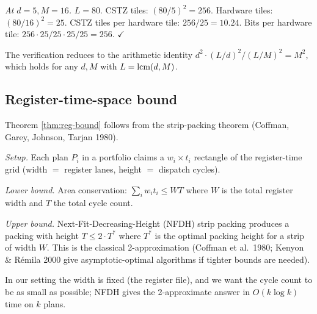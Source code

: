 \emph{At $d = 5, M = 16$.} $L = 80$. CSTZ tiles:
$(80/5)^2 = 256$. Hardware tiles: $(80/16)^2 = 25$.
CSTZ tiles per hardware tile: $256/25 = 10.24$.
Bits per hardware tile: $256 \cdot 25 / 25 \cdot 25
/ 25 = 256$. $\checkmark$

The verification reduces to the arithmetic
identity $d^2 \cdot (L/d)^2 / (L/M)^2 = M^2$,
which holds for any $d, M$ with $L = \operatorname{lcm}(d, M)$.

\subsection{Register-time-space bound}\label{app:b-rts}

Theorem \ref{thm:reg-bound} follows from the
strip-packing theorem (Coffman, Garey, Johnson,
Tarjan 1980).

\emph{Setup.} Each plan $P_i$ in a portfolio claims
a $w_i \times t_i$ rectangle of the register-time
grid (width $=$ register lanes, height $=$
dispatch cycles).

\emph{Lower bound.} Area conservation:
$\sum_i w_i t_i \leq W T$ where $W$ is the total
register width and $T$ the total cycle count.

\emph{Upper bound.} Next-Fit-Decreasing-Height
(NFDH) strip packing produces a packing with
height $T \leq 2 \cdot T^*$ where $T^*$ is the
optimal packing height for a strip of width $W$.
This is the classical 2-approximation (Coffman
et al.\ 1980; Kenyon \& R\'{e}mila 2000 give
asymptotic-optimal algorithms if tighter bounds
are needed).

In our setting the width is fixed (the register
file), and we want the cycle count to be as small
as possible; NFDH gives the 2-approximate answer
in $O(k \log k)$ time on $k$ plans.
